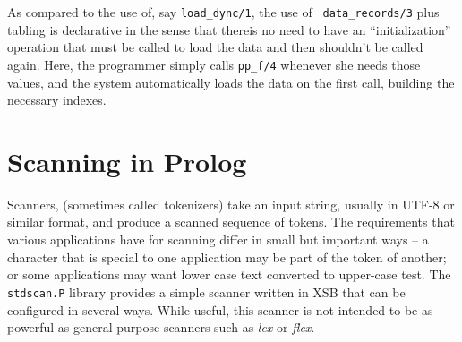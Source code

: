 \begin{description}
As compared to the use of, say {\tt load\_dync/1}, the use of {\tt
  data\_records/3} plus tabling is declarative in the sense that
thereis no need to have an ``initialization'' operation that must be
called to load the data and then shouldn't be called again.  Here, the
programmer simply calls {\tt pp\_f/4} whenever she needs those values,
and the system automatically loads the data on the first call,
building the necessary indexes.  

\end{description}

\section{Scanning in Prolog}

Scanners, (sometimes called tokenizers) take an input string, usually
in UTF-8 or similar format, and produce a scanned sequence of tokens.
The requirements that various applications have for scanning differ in
small but important ways -- a character that is special to one
application may be part of the token of another; or some applications
may want lower case text converted to upper-case test.  The {\tt
stdscan.P} library provides a simple scanner written in XSB that can
be configured in several ways.  While useful, this scanner is not
intended to be as powerful as general-purpose scanners such as {\em
lex} or {\em flex}.

